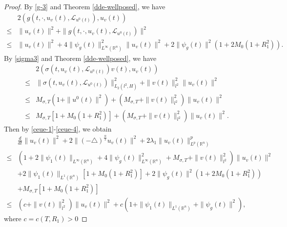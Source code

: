 \documentclass[11pt]{article}
\numberwithin{equation}{section}
\theoremstyle{plain}
\def\leq{\leqslant}
\begin{document}
\begin{proof}
 By \eqref{g-3} and Theorem \ref{dde-wellposed},
 we have
\begin{align}\label{ceue-3}
        & 2 \left( g(t, \cdot, u_v(t), \mathcal{L}_{u^0(t)} ), u_v(t) \right)
            \nonumber \\
   \leq & \| u_v(t) \|^2
           + \| g(t, \cdot, u_v(t), \mathcal{L}_{u^0(t)} ) \|^2
             \nonumber \\
   \leq & \| u_v(t) \|^2
           + 4 \| \psi_g(t) \|_{L^\infty(\mathbb{R}^n) }^2
                 \|  u_v(t) \|^2
                 + 2 \| \psi_g(t) \|^2
                 \left (
                 1+ 2M_0( 1 + R_1^2 )
                 \right )  .
\end{align}
By \eqref{sigma3} and Theorem \ref{dde-wellposed},  we have
\begin{align}\label{ceue-4}
        & 2
            \left( \sigma(t, u_v(t), \mathcal{L}_{u^0(t)} ) v(t),
                   u_v(t)
            \right)  \nonumber\\
   \leq & \| \sigma(t, u_v(t), \mathcal{L}_{u^0(t)} ) \|^2_{L_2(l^2, H)} + \| v(t) \|_{l^2}^2 \| u_v(t) \|^2 \nonumber\\
   \leq & M_{\sigma,T} \left( 1 + \|u^0(t)\|^2 \right)
          + \left( M_{\sigma,T} + \| v(t) \|_{l^2}^2 \right) \| u_v (t) \|^2
            \nonumber \\
   \leq & M_{\sigma,T} \left[ 1 + M_0\left( 1 + R_1^2 \right) \right]
          + \left( M_{\sigma,T} + \| v(t) \|_{l^2}^2 \right) \| u_v (t) \|^2.
\end{align}
Then by \eqref{ceue-1}-\eqref{ceue-4}, we obtain
\begin{align}\label{ceue-5}
      & \frac{d}{dt} \| u_v(t) \|^2
        + 2 \| (-\triangle)^{\frac{\alpha}{2}} u_v(t) \|^2
        + 2 \lambda_1 \| u_v(t) \|_{L^p(\mathbb{R}^n)}^{p}
             \nonumber \\
 \leq &
          \left( 1 +
          2 \| \psi_1 (t) \|
          _{L^\infty(\mathbb{R}^n) }
          + 4 \| \psi_g(t) \|_{L^\infty(\mathbb{R}^n) }^2
                   + M_{\sigma,T}
                   + \| v(t) \|_{l^2}^2
          \right) \| u_v(t) \|^2  \nonumber\\
      & + 2 \| \psi_{1}(t) \|_{L^1(\mathbb{R}^n)}
               \left[ 1 + M_0( 1 + R_1^2 ) \right]
        + 2 \| \psi_g(t) \| ^2
        (1+ 2 M_0( 1 + R_1^2 ) )
          \nonumber \\
      &
        + M_{\sigma,T} \left[ 1 + M_0(1 + R_1^2) \right]
        \nonumber \\
 \leq &
         \left( c + \| v(t) \|_{l^2}^2 \right) \| u_v(t) \|^2
         + c
             \left( 1 + \| \psi_{1}(t) \|_{L^1(\mathbb{R}^n)}
                      + \| \psi_g(t) \|^2
             \right),
\end{align}
 where $c=c(T, R_1)>0$



\end{proof}
\end{document}
